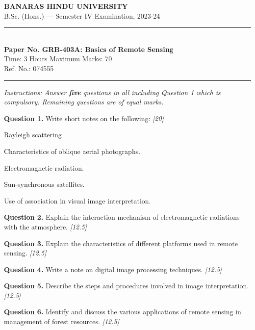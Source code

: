\documentclass[11pt,a4paper]{article}
\newcommand{\pts}[1]{\hfill   \textit{[#1]}}
\begin{document}
\begin{center}
  {\large\bfseries BANARAS HINDU UNIVERSITY}\\[2pt]
  {\normalsize B.Sc. (Hons.) --- Semester IV Examination, 2023-24}\\[6pt]
  \rule{0.8\linewidth}{0.5pt}\\[6pt]
  {\large\bfseries Paper No. GRB-403A: Basics of Remote Sensing}\\[4pt]
  {\normalsize Time: 3 Hours \hfill Maximum Marks: 70}\\[2pt]
  {\small Ref. No.: 074555}
\end{center}
\rule{\linewidth}{0.4pt}
\smallskip



\noindent   \textit{Instructions: Answer   \textbf{five} questions in all including Question 1 which is compulsory. Remaining questions are of equal marks.}
\bigskip




\noindent   \textbf{Question 1.} Write short notes on the following: \pts{20}

\begin{parts}
  \item Rayleigh scattering
  \item Characteristics of oblique aerial photographs.
  \item Electromagnetic radiation.
  \item Sun-synchronous satellites.
  \item Use of association in visual image interpretation.
\end{parts}

\medskip


\noindent   \textbf{Question 2.} Explain the interaction mechanism of electromagnetic radiations with the atmosphere. \pts{12.5}

\medskip


\noindent   \textbf{Question 3.} Explain the characteristics of different platforms used in remote sensing. \pts{12.5}

\medskip


\noindent   \textbf{Question 4.} Write a note on digital image processing techniques. \pts{12.5}

\medskip


\noindent   \textbf{Question 5.} Describe the steps and procedures involved in image interpretation. \pts{12.5}

\medskip


\noindent   \textbf{Question 6.} Identify and discuss the various applications of remote sensing in management of forest resources. \pts{12.5}
\end{document}
